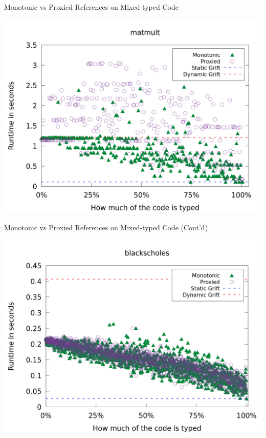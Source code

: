 \documentclass[12pt,dvipsnames]{beamer}
\begin{document}
\begin{frame}{Monotonic vs Proxied References on Mixed-typed Code}
  \begin{center}
    \includegraphics[scale=0.25]{plots/fine/Specialized_Coercions_Lazy/runtimes/matmult.png}
  \end{center}
\end{frame}


\begin{frame}{Monotonic vs Proxied References on Mixed-typed Code (Cont'd)}
  \begin{center}
    \includegraphics[scale=0.25]{plots/fine/Specialized_Coercions_Lazy/runtimes/blackscholes.png}
  \end{center}
\end{frame}
\end{document}
